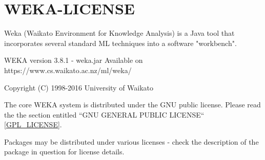 \chapter{WEKA-LICENSE} \label{WEKA_LICENSE}

\parindent=0pt

\small


Weka (Waikato Environment for Knowledge Analysis) is a Java tool that
incorporates several standard ML techniques into a software "workbench".

WEKA version 3.8.1 - weka.jar
Available on https://www.cs.waikato.ac.nz/ml/weka/

Copyright (C) 1998-2016  University of Waikato

The core WEKA system is distributed under the GNU public license.
Please read the the section entitled ``GNU GENERAL PUBLIC LICENSE`` \ref{GPL_LICENSE}.

Packages may be distributed under various licenses - check the
description of the package in question for license details.
